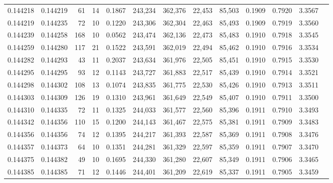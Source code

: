 \begin{tabular}{rrrrrrrrrrrrr}
0.144218 & 0.144219 &    61 &  14 &                                     0.1867 & 243,234 & 362,376 &  22,453 &  85,503 & 0.1909 & 0.7920 & 3.3567 \\
0.144219 & 0.144235 &    72 &  10 &                                     0.1220 & 243,306 & 362,304 &  22,463 &  85,493 & 0.1909 & 0.7919 & 3.3560 \\
0.144239 & 0.144258 &   168 &  10 &                                     0.0562 & 243,474 & 362,136 &  22,473 &  85,483 & 0.1910 & 0.7918 & 3.3545 \\
0.144259 & 0.144280 &   117 &  21 &                                     0.1522 & 243,591 & 362,019 &  22,494 &  85,462 & 0.1910 & 0.7916 & 3.3534 \\
0.144282 & 0.144293 &    43 &  11 &                                     0.2037 & 243,634 & 361,976 &  22,505 &  85,451 & 0.1910 & 0.7915 & 3.3530 \\
0.144295 & 0.144295 &    93 &  12 &                                     0.1143 & 243,727 & 361,883 &  22,517 &  85,439 & 0.1910 & 0.7914 & 3.3521 \\
0.144298 & 0.144302 &   108 &  13 &                                     0.1074 & 243,835 & 361,775 &  22,530 &  85,426 & 0.1910 & 0.7913 & 3.3511 \\
0.144303 & 0.144309 &   126 &  19 &                                     0.1310 & 243,961 & 361,649 &  22,549 &  85,407 & 0.1910 & 0.7911 & 3.3500 \\
0.144310 & 0.144335 &    72 &  11 &                                     0.1325 & 244,033 & 361,577 &  22,560 &  85,396 & 0.1911 & 0.7910 & 3.3493 \\
0.144342 & 0.144356 &   110 &  15 &                                     0.1200 & 244,143 & 361,467 &  22,575 &  85,381 & 0.1911 & 0.7909 & 3.3483 \\
0.144356 & 0.144356 &    74 &  12 &                                     0.1395 & 244,217 & 361,393 &  22,587 &  85,369 & 0.1911 & 0.7908 & 3.3476 \\
0.144357 & 0.144373 &    64 &  10 &                                     0.1351 & 244,281 & 361,329 &  22,597 &  85,359 & 0.1911 & 0.7907 & 3.3470 \\
0.144375 & 0.144382 &    49 &  10 &                                     0.1695 & 244,330 & 361,280 &  22,607 &  85,349 & 0.1911 & 0.7906 & 3.3465 \\
0.144385 & 0.144385 &    71 &  12 &                                     0.1446 & 244,401 & 361,209 &  22,619 &  85,337 & 0.1911 & 0.7905 & 3.3459 \\

\end{tabular}
